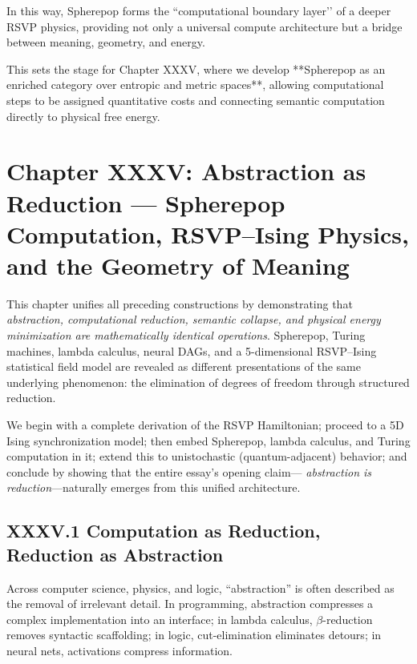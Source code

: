 \documentclass[12pt,letterpaper]{article}
\begin{document}
In this way, Spherepop forms the ``computational boundary layer’’ of a deeper RSVP physics, providing not only a universal compute architecture but a bridge between meaning, geometry, and energy.

This sets the stage for Chapter XXXV, where we develop **Spherepop as an enriched category over entropic and metric spaces**, allowing computational steps to be assigned quantitative costs and connecting semantic computation directly to physical free energy.

\newpage

\section{Chapter XXXV: Abstraction as Reduction —  
Spherepop Computation, RSVP–Ising Physics, and the Geometry of Meaning}

This chapter unifies all preceding constructions by demonstrating that 
\emph{abstraction, computational reduction, semantic collapse, 
and physical energy minimization are mathematically identical operations}.  
Spherepop, Turing machines, lambda calculus, neural DAGs, and 
a 5-dimensional RSVP–Ising statistical field model 
are revealed as different presentations of the same underlying phenomenon:
the elimination of degrees of freedom through structured reduction.

We begin with a complete derivation of the RSVP Hamiltonian; proceed to 
a 5D Ising synchronization model; then embed 
Spherepop, lambda calculus, and Turing computation in it; 
extend this to unistochastic (quantum-adjacent) behavior; 
and conclude by showing that the entire essay's opening claim—
\emph{abstraction is reduction}—naturally emerges from this unified architecture.

\subsection{XXXV.1 Computation as Reduction, Reduction as Abstraction}

Across computer science, physics, and logic, ``abstraction'' is often described as 
the removal of irrelevant detail. In programming, abstraction compresses a complex implementation
into an interface; in lambda calculus, $\beta$-reduction removes syntactic scaffolding; 
in logic, cut-elimination eliminates detours; in neural nets, activations compress information.  
\end{document}
